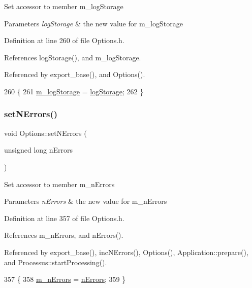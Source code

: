 Set accessor to member m\+\_\+log\+Storage 
\begin{DoxyParams}{Parameters}
{\em log\+Storage} & the new value for m\+\_\+log\+Storage \\
\hline
\end{DoxyParams}


Definition at line 260 of file Options.\+h.



References log\+Storage(), and m\+\_\+log\+Storage.



Referenced by export\+\_\+base(), and Options().


\begin{DoxyCode}
260                                              \{
261                 \hyperlink{classOptions_ab7ffad5110df714233470725ef98be6e}{m\_logStorage} = \hyperlink{classOptions_a33735fffe17485937ab7579d8716b7ee}{logStorage};
262         \}
\end{DoxyCode}
\mbox{\label{classOptions_a45368b495036869c67fe0e6bf9abc4e6}} 
\subsubsection{\texorpdfstring{set\+N\+Errors()}{setNErrors()}}
{\footnotesize\ttfamily void Options\+::set\+N\+Errors (\begin{DoxyParamCaption}\item[{unsigned long}]{n\+Errors }\end{DoxyParamCaption})\hspace{0.3cm}{\ttfamily [inline]}}

Set accessor to member m\+\_\+n\+Errors 
\begin{DoxyParams}{Parameters}
{\em n\+Errors} & the new value for m\+\_\+n\+Errors \\
\hline
\end{DoxyParams}


Definition at line 357 of file Options.\+h.



References m\+\_\+n\+Errors, and n\+Errors().



Referenced by export\+\_\+base(), inc\+N\+Errors(), Options(), Application\+::prepare(), and Processus\+::start\+Processing().


\begin{DoxyCode}
357                                                 \{
358                 \hyperlink{classOptions_ae6460776ac3433103d88729a6811fc56}{m\_nErrors} = \hyperlink{classOptions_acc6474323f0bbe17fa844e9a086b90b8}{nErrors};
359         \}
\end{DoxyCode}
\mbox{\label{classOptions_ae6a0fdaa736948f5040deb3eb6889268}} 
